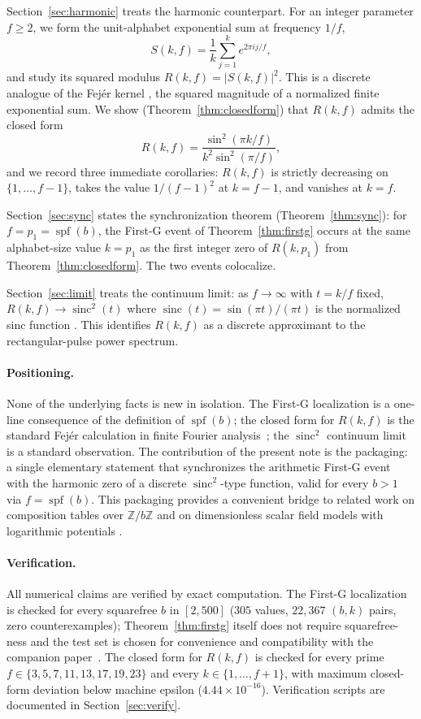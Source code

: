 \documentclass[11pt,reqno]{amsart}
\theoremstyle{plain}
\theoremstyle{definition}
\theoremstyle{remark}
\DeclareMathOperator{\spf}{spf}
\DeclareMathOperator{\sinc}{sinc}
\newcommand{\Z}{\mathbb{Z}}
\newcommand{\Zb}{\Z/b\Z}
\begin{document}
Section~\ref{sec:harmonic} treats the harmonic counterpart. For an
integer parameter $f \ge 2$, we form the unit-alphabet exponential
sum at frequency $1/f$,
\[
  S(k,f) = \frac{1}{k}\sum_{j=1}^{k} e^{2\pi i j/f},
\]
and study its squared modulus $R(k,f) = |S(k,f)|^{2}$. This is a
discrete analogue of the Fej\'{e}r kernel \cite{Fejer1900,Zygmund2002},
the squared magnitude of a normalized finite exponential sum. We show
(Theorem~\ref{thm:closedform}) that $R(k,f)$ admits the closed form
\[
  R(k,f) = \frac{\sin^{2}(\pi k/f)}{k^{2}\sin^{2}(\pi/f)},
\]
and we record three immediate corollaries: $R(k,f)$ is strictly
decreasing on $\{1,\dots,f-1\}$, takes the value $1/(f-1)^{2}$ at
$k=f-1$, and vanishes at $k=f$.

Section~\ref{sec:sync} states the synchronization theorem
(Theorem~\ref{thm:sync}): for $f = p_{1} = \spf(b)$, the First-G
event of Theorem~\ref{thm:firstg} occurs at the same alphabet-size
value $k = p_{1}$ as the first integer zero of $R(k,p_{1})$ from
Theorem~\ref{thm:closedform}. The two events colocalize.

Section~\ref{sec:limit} treats the continuum limit: as $f\to\infty$
with $t = k/f$ fixed, $R(k,f) \to \sinc^{2}(t)$ where
$\sinc(t) = \sin(\pi t)/(\pi t)$ is the normalized sinc function
\cite{Shannon1949,OppenheimSchafer2010}. This identifies $R(k,f)$
as a discrete approximant to the rectangular-pulse power spectrum.

\paragraph{Positioning.} None of the underlying facts is new in
isolation. The First-G localization is a one-line consequence of the
definition of $\spf(b)$; the closed form for $R(k,f)$ is the standard
Fej\'{e}r calculation in finite Fourier analysis~\cite{Zygmund2002,
OppenheimSchafer2010}; the $\sinc^{2}$ continuum limit is a standard
observation. The contribution of the present note is the packaging:
a single elementary statement that synchronizes the arithmetic
First-G event with the harmonic zero of a discrete $\sinc^{2}$-type
function, valid for every $b > 1$ via $f = \spf(b)$. This packaging
provides a convenient bridge to related work on composition tables
over $\Zb$ \cite{SandersGish2026Sigma} and on dimensionless scalar
field models with logarithmic potentials
\cite{SandersGishJohnson2026JCAP}.

\paragraph{Verification.} All numerical claims are verified by exact
computation. The First-G localization is checked for every squarefree
$b$ in $[2,500]$ ($305$ values, $22{,}367$ $(b,k)$ pairs, zero
counterexamples); Theorem~\ref{thm:firstg} itself does not require
squarefree-ness and the test set is chosen for convenience and
compatibility with the companion paper~\cite{SandersGish2026Sigma}.
The closed form for $R(k,f)$ is checked for every prime
$f \in \{3,5,7,11,13,17,19,23\}$ and every $k\in\{1,\dots,f+1\}$,
with maximum closed-form deviation below machine epsilon
($4.44\times 10^{-16}$). Verification scripts are documented in
Section~\ref{sec:verify}.
\end{document}
